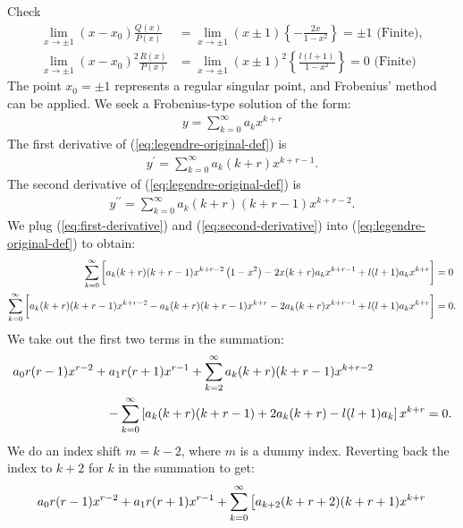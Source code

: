 \begin{enumerate}[label={(\arabic*)}]
\begin{enumerate}[label={(\alph*)}]
    Check
    \begin{align}
        \lim_{x\to\pm1}\left(x-x_0\right)\frac{Q(x)}{P(x)} &= \lim_{x\to\pm1}\left(x\pm1\right)\left\{-\frac{2x}{1-x^2}\right\}=\pm1 \text{ (Finite)}, \\
        \lim_{x\to\pm1}\left(x-x_0\right)^2\frac{R(x)}{P(x)} &= \lim_{x\to\pm1}\left(x\pm1\right)^2\left\{\frac{l(l + 1)}{1-x^2}\right\}=0 \text{ (Finite)}
    \end{align}
    The point $x_0 = \pm 1$ represents a regular singular point, and Frobenius' method can be applied. We seek a Frobenius-type solution of the form:
    \begin{align}
        y = \sum_{k=0}^{\infty} a_k x^{k+r}
    \end{align}
    The first derivative of (\ref{eq:legendre-original-def}) is
    \begin{align}
        y^{\prime} = \sum_{k=0}^{\infty} a_k (k+r) x^{k+r-1}.\label{eq:first-derivative}
    \end{align}
    The second derivative of (\ref{eq:legendre-original-def}) is
    \begin{align}
        y^{\prime\prime} = \sum_{k=0}^{\infty} a_k (k+r) (k+r-1) x^{k+r-2}.\label{eq:second-derivative}
    \end{align}
    We plug (\ref{eq:first-derivative}) and (\ref{eq:second-derivative}) into (\ref{eq:legendre-original-def}) to obtain:
    \begin{align}
        \sum_{k=0}^{\infty} \bigg[a_k(k+r)(k+r-1) x^{k+r-2}\left(1-x^2\right) - 2x(k+r) a_k x^{k+r-1} + l(l + 1) a_k x^{k+r} \bigg] &= 0\notag\\
        \sum_{k=0}^{\infty} \bigg[a_k (k+r)(k+r-1) x^{k+r-2} - a_k (k+r)(k+r-1) x^{k+r} - 2 a_k (k+r) x^{k+r-1} + l(l + 1) a_k x^{k+r} \bigg] &= 0.
    \end{align}
    We take out the first two terms in the summation:
    \begin{align}
        a_0 r(r-1) x^{r-2} &+ a_1 r(r+1) x^{r-1} 
        + \sum_{k=2}^\infty a_k (k+r)(k+r-1) x^{k+r-2} \notag \\
        &\hspace{10pt}- \sum_{k=0}^{\infty} \left[ a_k (k+r)(k+r-1) + 2a_k(k+r) - l(l + 1) a_k \right] x^{k+r} = 0.
    \end{align}
    We do an index shift $m = k-2$, where $m$ is a dummy index. Reverting back the index to $k+2$ for $k$ in the  summation to get:
    \begin{align}
        &a_0 r (r-1) x^{r-2} + a_1 r (r+1) x^{r-1} + \sum_{k=0}^\infty \left[ a_{k+2} (k+r+2) (k+r+1) x^{k+r} \right. \notag\\

\end{align}
\end{enumerate}
\end{enumerate}
